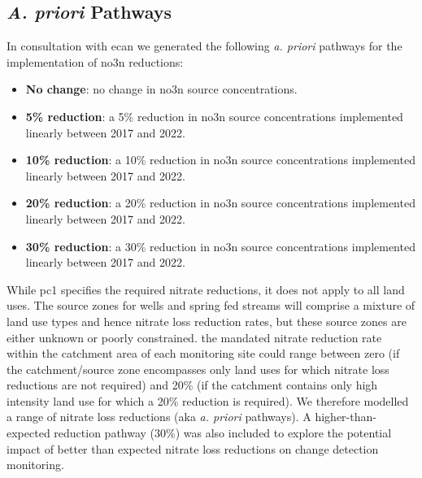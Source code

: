 
\begin{landscape}
\end{landscape}


\subsection[Pathways]{\textit{A. priori} Pathways} \label{subsec:apriori}

In consultation with \gls{ecan} we generated the following \textit{a. priori} pathways for the implementation of \gls{no3n} reductions:
\begin{itemize}
    \item \textbf{No change}: no change in \gls{no3n} source concentrations.
    \item \textbf{5\% reduction}: a 5\% reduction in \gls{no3n} source concentrations implemented linearly between 2017 and 2022.
    \item \textbf{10\% reduction}: a 10\% reduction in \gls{no3n} source concentrations implemented linearly between 2017 and 2022.
    \item \textbf{20\% reduction}: a 20\% reduction in \gls{no3n} source concentrations implemented linearly between 2017 and 2022.
    \item \textbf{30\% reduction}: a 30\% reduction in \gls{no3n} source concentrations implemented linearly between 2017 and 2022.
\end{itemize}

While \gls{pc1} specifies the required nitrate reductions, it does not apply to all land uses.
The source zones for wells and spring fed streams will comprise a mixture of land use types and hence nitrate loss reduction rates, but these source zones are either unknown or poorly constrained.
the mandated nitrate reduction rate within the catchment area of each monitoring site could range between zero (if the catchment/source zone encompasses only land uses for which nitrate loss reductions are not required) and 20\% (if the catchment contains only high intensity land use for which a 20\% reduction is required).
We therefore modelled a range of nitrate loss reductions (aka \textit{a. priori} pathways).
A higher-than-expected reduction pathway (30\%) was also included to explore the potential impact of better than expected nitrate loss reductions on change detection monitoring.

